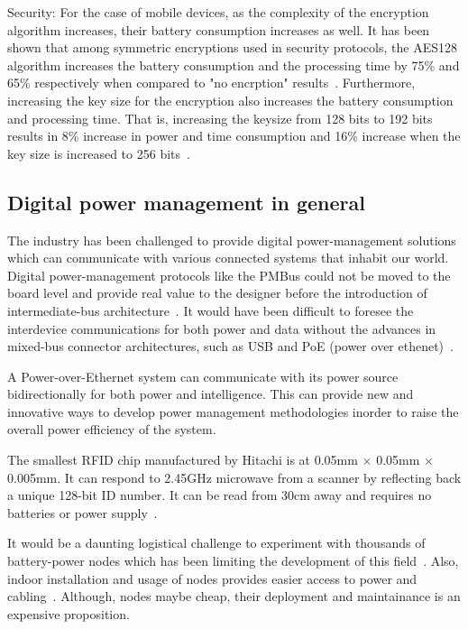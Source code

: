 \documentclass[draft,a4paper]{siamltex}
\begin{document}
Security:
For the case of mobile devices, as the complexity of the encryption algorithm
increases, their battery consumption increases as well. It has been shown that
among symmetric encryptions used in security protocols, the AES128 algorithm
increases the battery consumption and the processing time by 75\% and 65\%
respectively when compared to "no encrption" results~\cite{hamad2009energy}.
Furthermore, increasing the key size for the encryption also increases the
battery consumption and processing time. That is, increasing the keysize from
128 bits to 192 bits results in 8\% increase in power and time consumption and
16\% increase when the key size is increased to 256
bits~\cite{hamad2009energy}.

\subsection{Digital power management in general}

The industry has been challenged to provide digital power-management solutions
which can communicate with various connected systems that inhabit our world.
Digital power-management protocols like the PMBus could not be moved to the
board level and provide real value to the designer before the introduction of
intermediate-bus architecture~\cite{FutureIOT}. It would have been difficult to
foresee the interdevice communications for both power and data without the
advances in mixed-bus connector architectures, such as USB and PoE (power over
ethenet)~\cite{FutureIOT}. 

A Power-over-Ethernet system can communicate with its power source
bidirectionally for both power and intelligence. This can provide new and
innovative ways to develop power management methodologies inorder to raise the
overall power efficiency of the system.

%
%

The smallest RFID chip manufactured by Hitachi is at 0.05mm $\times$ 0.05mm
$\times$ 0.005mm. It can respond to 2.45GHz microwave from a scanner by
reflecting back a unique 128-bit ID number. It can be read from 30cm away and
requires no batteries or power supply~\cite{hornyak2008rfid}.

It would be a daunting logistical challenge to experiment with thousands of
battery-power nodes which has been limiting the development of this
field~\cite{gluhak2011survey}. Also, indoor installation and usage of nodes
provides easier access to power and cabling~\cite{gluhak2011survey}. Although,
nodes maybe cheap, their deployment and maintainance is an expensive
proposition.
\end{document}
